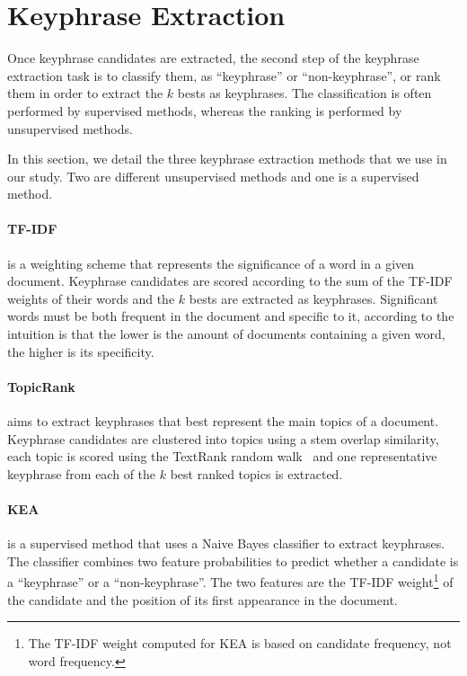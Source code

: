 \section{Keyphrase Extraction}
\label{sec:keyphrase_extraction}
  Once keyphrase candidates are extracted, the second step of the keyphrase
  extraction task is to classify them, as ``keyphrase'' or ``non-keyphrase'', or
  rank them in order to extract the $k$ bests as keyphrases. The classification
  is often performed by supervised methods, whereas the ranking is performed by
  unsupervised methods.

  In this section, we detail the three keyphrase extraction methods that we use
  in our study. Two are different unsupervised methods and one is a supervised
  method.

  \paragraph{TF-IDF~\textnormal{\cite{jones1972tfidf}}} is a weighting scheme
  that represents the significance of a word in a given document. Keyphrase
  candidates are scored according to the sum of the TF-IDF weights of their
  words and the $k$ bests are extracted as keyphrases. Significant words must be
  both frequent in the document and specific to it, according to the intuition
  is that the lower is the amount of documents containing a given word, the
  higher is its specificity.

  \paragraph{TopicRank~\textnormal{\cite{bougouin2013topicrank}}} aims to
  extract keyphrases that best represent the main topics of a document.
  Keyphrase candidates are clustered into topics using a stem overlap
  similarity, each topic is scored using the TextRank random
  walk~\cite{mihalcea2004textrank} and one representative keyphrase from each of
  the $k$ best ranked topics is extracted.

  \paragraph{KEA~\textnormal{\cite{witten1999kea}}} is a supervised method that
  uses a Naive Bayes classifier to extract keyphrases. The classifier combines
  two feature probabilities to predict whether a candidate is a ``keyphrase'' or
  a ``non-keyphrase''. The two features are the TF-IDF weight\footnote{The
    TF-IDF weight computed for KEA is based on candidate frequency, not word
  frequency.} of the candidate and the position of its first appearance in the
  document.

